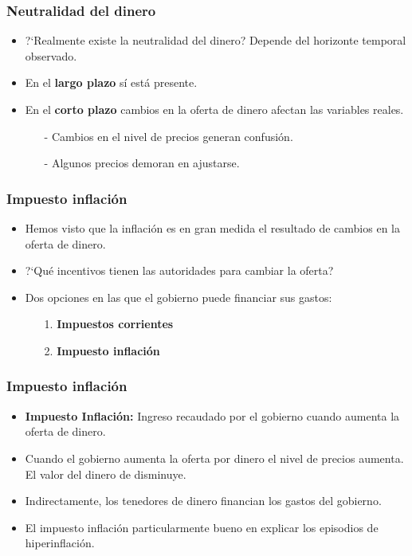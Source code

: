 \documentclass{beamer}
\begin{document}
\begin{frame}
\frametitle{Neutralidad del dinero}
\begin{itemize}
\setlength\itemsep{1.4em}
\item  ?`Realmente existe la neutralidad del dinero? Depende del horizonte temporal observado.
\item En el \textbf{largo plazo} s\'i est\'a presente. 
\item En el \textbf{corto plazo} cambios en la oferta de dinero afectan las variables reales.\\
\begin{itemize}
\setlength\itemsep{0.8em}
\item[-] Cambios en el nivel de precios generan confusi\'on.
\item[-] Algunos precios demoran en ajustarse.
\end{itemize}
\end{itemize}
\end{frame}

\begin{frame}
\frametitle{Impuesto inflaci\'on}
\begin{itemize}
\setlength\itemsep{1.4em}
\item Hemos visto que la inflaci\'on es en gran medida el resultado de cambios en la oferta de dinero.
\item ?`Qu\'e incentivos tienen las autoridades para cambiar la oferta?
\item Dos opciones en las que el gobierno puede financiar sus gastos:\\
\begin{itemize}
\setlength\itemsep{1.0em}
\item[1.] \textbf{Impuestos corrientes}
\item[2.] \textbf{Impuesto inflaci\'on}
\end{itemize}
\end{itemize}
\end{frame}

\begin{frame}
\frametitle{Impuesto inflaci\'on}
\begin{itemize}
\setlength\itemsep{1.4em}
\item \textbf{Impuesto Inflaci\'on:} Ingreso recaudado por el gobierno cuando aumenta la oferta de dinero.
\item Cuando el gobierno aumenta la oferta por dinero el nivel de precios aumenta. El valor del dinero de disminuye.
\item Indirectamente, los tenedores de dinero financian los gastos del gobierno.
\item El impuesto inflaci\'on particularmente bueno en explicar los episodios de hiperinflaci\'on.
\end{itemize}
\end{frame}
\end{document}
